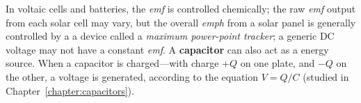 In voltaic cells and batteries, the \emph{emf} is controlled chemically; the
raw \emph{emf} output from each solar cell may vary, but the overall
\emph{emph} from a solar panel is generally controlled by a a device called a
\emph{maximum power-point tracker}; a generic DC voltage may not have a
constant \emph{emf}. A \textbf{capacitor} can also act as a energy source. When
a capacitor is charged---with charge $+Q$ on one plate, and $-Q$ on the other,
a voltage is generated, according to the equation $V=Q/C$ (studied in
Chapter~\ref{chapter:capacitors}).

